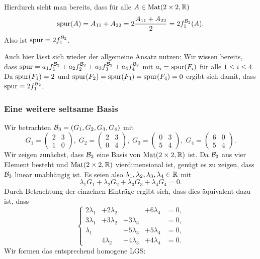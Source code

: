 \documentclass[a4paper,10pt]{article}
\begin{document}
Hierdurch sieht man bereits, dass für alle $A \in \mathrm{Mat}(2 \times 2, \mathbb{R})$
\[
 \mathrm{spur}(A)
 = A_{11} + A_{22}
 = 2 \frac{A_{11} + A_{22}}{2}
 = 2 f^{\mathcal{B}_2}_1(A).
\]
Also ist $\mathrm{spur} = 2f^{\mathcal{B}_2}_1$.

Auch hier lässt sich wieder der allgemeine Ansatz nutzen: Wir wissen bereits, dass $\mathrm{spur} = a_1 f^{\mathcal{B}_2}_1 + a_2 f^{\mathcal{B}_2}_2 + a_3 f^{\mathcal{B}_2}_3 + a_4 f^{\mathcal{B}_2}_4$ mit $a_i = \mathrm{spur}(F_i)$ für alle $1 \leq i \leq 4$. Da $\mathrm{spur}(F_1) = 2$ und $\mathrm{spur}(F_2) = \mathrm{spur}(F_3) = \mathrm{spur}(F_4) = 0$ ergibt sich damit, dass $\mathrm{spur} = 2 f^{\mathcal{B}_2}_1$.


\subsubsection{Eine weitere seltsame Basis}
Wir betrachten $\mathcal{B}_3 = (G_1, G_2, G_3, G_4)$ mit
\[
 G_1 = \begin{pmatrix} 2 & 3 \\ 1 & 0 \end{pmatrix}, \;
 G_2 = \begin{pmatrix} 2 & 3 \\ 0 & 4 \end{pmatrix}, \;
 G_3 = \begin{pmatrix} 0 & 3 \\ 5 & 4 \end{pmatrix}, \;
 G_4 = \begin{pmatrix} 6 & 0 \\ 5 & 4 \end{pmatrix}.
\]
Wir zeigen zunächst, dass $\mathcal{B}_3$ eine Basis von $\mathrm{Mat}(2 \times 2, \mathbb{R})$ ist. Da $\mathcal{B}_3$ aus vier Element besteht und $\mathrm{Mat}(2 \times 2, \mathbb{R})$ vierdimensional ist, genügt es zu zeigen, dass $\mathcal{B}_3$ linear unabhängig ist. Es seien also $\lambda_1, \lambda_2, \lambda_3, \lambda_4 \in \mathbb{R}$ mit
\[
 \lambda_1 G_1 + \lambda_2 G_2 + \lambda_3 G_3 + \lambda_4 G_4 = 0.
\]
Durch Betrachtung der einzelnen Einträge ergibt sich, dass dies äquivalent dazu ist, dass
\[
 \left\{
  \begin{matrix}
   2\lambda_1 & +2\lambda_2 &             & +6\lambda_4 & = 0, \\
   3\lambda_1 & +3\lambda_2 & +3\lambda_3 &             & = 0, \\
    \lambda_1 &             & +5\lambda_3 & +5\lambda_4 & = 0, \\
              & 4\lambda_2  & +4\lambda_3 & +4\lambda_4 & = 0.
  \end{matrix}
  \right.
\]
Wir formen das entsprechend homogene LGS:
\end{document}

